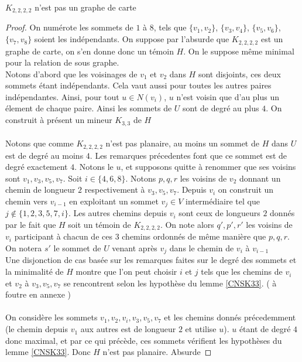 \documentclass{scrartcl}
\begin{document}
\begin{flushleft}
\begin{prop}\label{K2222}
    $K_{2,2,2,2}$ n'est pas un graphe de carte
\end{prop}

\begin{proof}
    On numérote les sommets de $1$ à $8$, tels que $\{v_1,v_2\}$, $\{v_3,v_4\}$, $\{v_5,v_6\}$, $\{v_7,v_8\}$ soient les indépendants.
    On suppose par l'absurde que $K_{2,2,2,2}$ est un graphe de carte, on s'en donne donc un témoin $H$. On le suppose même minimal pour
    la relation de sous graphe.\\
    Notons d'abord que les voisinages de $v_1$ et $v_2$ dans $H$ sont disjoints, ces deux sommets étant indépendants. Cela vaut
    aussi pour toutes les autres paires indépendantes. Ainsi, pour tout $u \in N(v_i)$, $u$ n'est voisin que d'au plus un élement de
    chaque paire. Ainsi les sommets de $U$ sont de degré au plus $4$. On construit à présent un mineur $K_{3,3}$ de $H$
    \\~\\
    Notons que comme $K_{2,2,2,2}$ n'est pas planaire, au moins un sommet de $H$ dans $U$ est de degré au moins $4$. Les remarques
    précedentes font que ce sommet est de degré exactement $4$. Notons le $u$, et supposons quitte à renommer que ses voisins
    sont $v_1, v_3, v_5, v_7$. Soit $i \in \{4, 6, 8\}$. Notons $p, q, r$ les voisins de $v_2$ donnant un chemin de longueur
    $2$ respectivement à $v_3, v_5, v_7$. Depuis $v_i$ on construit un chemin vers $v_{i-1}$ en exploitant un sommet $v_j \in V$ intermédiaire
    tel que $j \notin \{1, 2, 3, 5, 7, i\}$. Les autres chemins depuis $v_i$ sont ceux de longueurs $2$ donnés par le fait que $H$ soit
    un témoin de $K_{2,2,2,2}$. On note alors $q', p', r'$ les voisins de $v_i$ participant à chacun de ces $3$ chemins
    ordonnés de même manière que $p, q, r$. On notera $s'$ le sommet de $U$ venant après $v_j$ dans le chemin de $v_i$ à $v_{i-1}$\\
    Une disjonction de cas basée sur les remarques faites sur le degré des sommets et la minimalité de $H$ montre
    que l'on peut choisir $i$ et $j$ tels que les chemins de $v_i$ et $v_2$ à $v_3, v_5, v_7$ se rencontrent selon
    les hypothèse du lemme \ref{CNSK33}. ( à foutre en annexe )
    \\~\\
    On considère les sommets $v_1, v_2, v_i, v_3, v_5, v_7$ et les chemins donnés précedemment (le chemin depuis $v_1$ aux autres est de longueur
    $2$ et utilise $u$). $u$ étant de degré $4$ donc maximal, et par ce qui précède, ces sommets vérifient les hypothèses du lemme
    \ref{CNSK33}. Donc $H$ n'est pas planaire. Absurde
\end{proof}


\end{flushleft}
\end{document}
